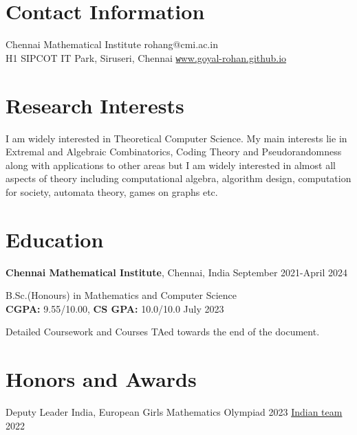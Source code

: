 \documentclass[margin,line, 10pt]{res}
\begin{document}

\begin{resume}
\section{\sc Contact Information}
Chennai Mathematical Institute \hfill {rohang@cmi.ac.in}\\
H1 SIPCOT IT Park, Siruseri, Chennai \hfill \href{https://goyal-rohan.github.io/}{\texttt www.goyal-rohan.github.io}

\section{\sc Research Interests}
I am widely interested in Theoretical Computer Science. My main interests lie in Extremal and Algebraic Combinatorics, Coding Theory and Pseudorandomness along with applications to other areas but I am widely interested in almost all aspects of theory including computational algebra, algorithm design, computation for society, automata theory, games on graphs etc.

\section{\sc Education}


{\bf Chennai Mathematical Institute}, Chennai, India \hfill September 2021-April 2024

\vspace{-0.4cm}
B.Sc.(Honours) in Mathematics and Computer Science\\ {\bf CGPA:} 9.55/10.00, {\bf CS GPA:} 10.0/10.0 \hfill July 2023


\vspace*{-0.3cm}
Detailed Coursework and Courses TAed towards the end of the document.


\section{\sc Honors and Awards} 
Deputy Leader India, European Girls Mathematics Olympiad 2023 \href{https://www.egmo.org/egmos/egmo12/countries/country35/}{Indian team} \hfill 2022


\end{resume}
\end{document}

